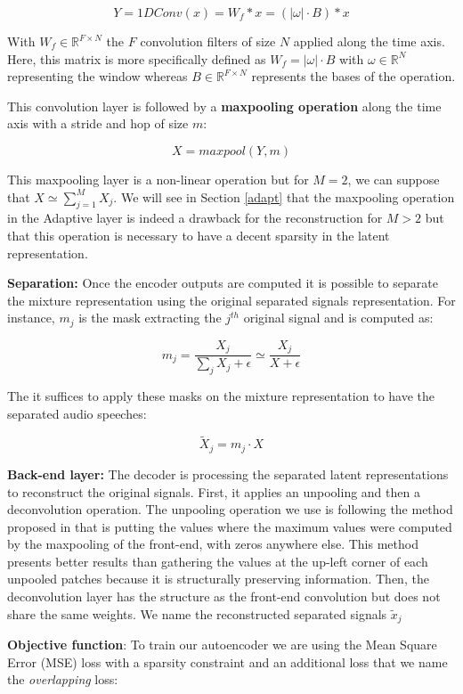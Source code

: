 \documentclass[master, tikz, final,11pt, dvipdfmx]{iscs-thesis}
\begin{document}
\[Y = 1DConv(x) = W_{f} \ast x = (|\omega| \cdot B) \ast x\]

With $W_f \in \mathbb{R}^{F\times N}$ the $F$ convolution filters of size $N$ applied along the time axis. Here, this matrix is more specifically defined as $W_f = |\omega|\cdot B$ with $\omega \in \mathbb{R}^{N}$ representing the window whereas $B \in \mathbb{R}^{F\times N}$ represents the bases of the operation.

This convolution layer is followed by a \textbf{maxpooling operation} along the time axis with a stride and hop of size $m$:

\[X = maxpool(Y, m)\]

This maxpooling layer is a non-linear operation but for $M = 2$, we can suppose that $X \simeq \sum_{j=1}^{M}{X_j}$. We will see in Section \ref{adapt} that the maxpooling operation in the Adaptive layer is indeed a drawback for the reconstruction for $M > 2$ but that this operation is necessary to have a decent sparsity in the latent representation.

\textbf{Separation:} Once the encoder outputs are computed it is possible to separate the mixture representation using the original separated signals representation. For instance, $m_j$ is the mask extracting the $j^{th}$ original signal and is computed as:

\[m_j = \frac{X_j}{\sum_j{X_j} + \epsilon} \simeq  \frac{X_j}{X + \epsilon}\]

The it suffices to apply these masks on the mixture representation to have the separated audio speeches:

\[\tilde X _j = m_j \cdot X\]

\textbf{Back-end layer:} The decoder is processing the separated latent representations to reconstruct the original signals. First, it applies an unpooling and then a deconvolution operation. The unpooling operation we use is following the method proposed in \cite{unpool} that is putting the values where the maximum values were computed by the maxpooling of the front-end, with zeros anywhere else. This method presents better results than gathering the values at the up-left corner of each unpooled patches because it is structurally preserving information. Then, the deconvolution layer has the structure as the front-end convolution but does not share the same weights. We name the reconstructed separated signals $\tilde x _j$

\textbf{Objective function}: To train our autoencoder we are using the Mean Square Error (MSE) loss with a sparsity constraint and an additional loss that we name the \textit{overlapping} loss:
\end{document}
